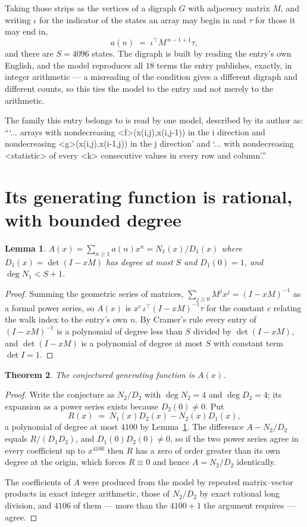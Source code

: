 \documentclass[11pt,a4paper]{article}
\theoremstyle{plain}
\newtheorem{theorem}{Theorem}
\newtheorem{lemma}[theorem]{Lemma}
\theoremstyle{definition}
\begin{document}
Taking those strips as the vertices of a digraph $G$ with adjacency matrix $M$, and writing
$\iota$ for the indicator of the states an array may begin in and $\tau$ for those it may end
in,
\[
a(n)\;=\;\iota^{\!\top}M^{\,n-1+1}\tau ,
\]
and there are $S=4096$ states. The digraph is built by reading the entry's own English, and the
model reproduces all $18$ terms the entry publishes, exactly, in integer arithmetic --- a
misreading of the condition gives a different digraph and different counts, so this ties the
model to the entry and not merely to the arithmetic.

The family this entry belongs to is read by one model, described by its author as: ```... arrays with nondecreasing <f>(x(i,j),x(i,j-1)) in the i direction and nondecreasing <g>(x(i,j),x(i-1,j)) in the j direction' and `... with nondecreasing <statistic> of every <k> consecutive values in every row and column'.''


\section{Its generating function is rational, with bounded degree}

\begin{lemma}\label{lem:rat}
$A(x)=\sum_{n\ge1}a(n)x^n=N_1(x)/D_1(x)$ where $D_1(x)=\det(I-xM)$ has degree at most
$S$ and $D_1(0)=1$, and $\deg N_1<S+1$.
\end{lemma}

\begin{proof}
Summing the geometric series of matrices, $\sum_{j\ge0}M^jx^j=(I-xM)^{-1}$ as a formal
power series, so $A(x)$ is $x^{c}\,\iota^{\!\top}(I-xM)^{-1}\tau$ for the constant $c$
relating the walk index to the entry's own $n$. By Cramer's rule every entry of
$(I-xM)^{-1}$ is a polynomial of degree less than $S$ divided by $\det(I-xM)$, and
$\det(I-xM)$ is a polynomial of degree at most $S$ with constant term $\det I=1$.
\end{proof}

\begin{theorem}
The conjectured generating function is $A(x)$.
\end{theorem}

\begin{proof}
Write the conjecture as $N_2/D_2$ with $\deg N_2=4$ and $\deg D_2=4$; its expansion as a
power series exists because $D_2(0)\neq0$. Put
\[
R(x)\;=\;N_1(x)D_2(x)-N_2(x)D_1(x),
\]
a polynomial of degree at most $4100$ by Lemma~\ref{lem:rat}. The difference
$A-N_2/D_2$ equals $R/(D_1D_2)$, and $D_1(0)D_2(0)\neq0$, so if the two power series agree in
every coefficient up to $x^{4100}$ then $R$ has a zero of order greater than its own
degree at the origin, which forces $R\equiv0$ and hence $A=N_2/D_2$ identically.

The coefficients of $A$ were produced from the model by repeated matrix--vector products in
exact integer arithmetic, those of $N_2/D_2$ by exact rational long division, and $4106$
of them --- more than the $4100+1$ the argument requires --- agree.
\end{proof}
\end{document}
